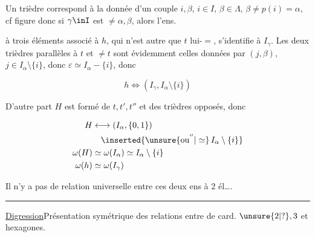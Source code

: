 
Un trièdre correspond à la donnée d'un couple $i,\beta$, $i\in I$, $\beta\in\Lambda$, $\beta\ne p(i)=\alpha$, cf figure donc si $\gamma\inI$ est $\ne\alpha,\beta$, alors l'ens.


à trois éléments associé à $h$, qui n'est autre que $t$ lui-$=$, s'identifie à $I_\gamma$. Les deux trièdres  parallèles à $t$ et $\ne t$ sont évidemment celles données par $(j,\beta)$, $j\in I_\alpha\setminus\{i\}$, donc $\varepsilon\simeq I_\alpha-\{i\}$, donc

\[
h\Leftrightarrow(I_\gamma,I_\alpha\setminus\{i\})
\]


D'autre part $H$ est formé de $t,t',t''$ et des trièdres opposés, donc

\[
\begin{aligned}
H&\longleftrightarrow(I_\alpha,\{0,1\})\\
&\quad\inserted{\unsure{\text{ou}^{''}|\simeq}\,I_\alpha\setminus\{i\}}\\
\omega(H)&\simeq\omega(I_\alpha)\simeq I_\alpha\setminus\{i\}\\
\omega(h)&\simeq\omega(I_\gamma)
\end{aligned}
\]

Il n'y a pas de relation universelle entre ces deux ens à $2$ él\ldots.

\noindent\rule{1.3cm}{.35pt}\par
{}\quad\uline{Digression}\quad Présentation symétrique des relations entre   de card. $\unsure{2|?},3$ et hexagones.

